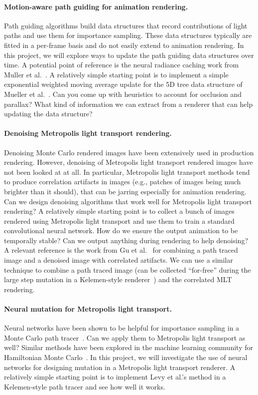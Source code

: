 \paragraph{Motion-aware path guiding for animation rendering.}
Path guiding algorithms build data structures that record contributions of light paths and use them for importance sampling.
These data structures typically are fitted in a per-frame basis and do not easily extend to animation rendering. 
In this project, we will explore ways to update the path guiding data structures over time.
A potential point of reference is the neural radiance caching work from Muller et al.~\cite{Muller:2021:RNR}.
A relatively simple starting point is to implement a simple exponential weighted moving average update for the 5D tree data structure of Mueller et al.~\cite{Mueller:2017:PPG}.
Can you come up with heuristics to account for occlusion and parallax? What kind of information we can extract from a renderer that can help updating the data structure?

\paragraph{Denoising Metropolis light transport rendering.}
Denoising Monte Carlo rendered images have been extensively used in production rendering.
However, denoising of Metropolis light transport rendered images have not been looked at at all.
In particular, Metropolis light transport methods tend to produce correlation artifacts in images (e.g., patches of images being much brighter than it should), that can be jarring especially for animation rendering.
Can we design denoising algorithms that work well for Metropolis light transport rendering?
A relatively simple starting point is to collect a bunch of images rendered using Metropolis light transport and use them to train a standard convolutional neural network.
How do we ensure the output animation to be temporally stable?
Can we output anything during rendering to help denoising? A relevant reference is the work from Gu et al.~\cite{Gu:2022:NJC} for combining a path traced image and a denoised image with correlated artifacts.
We can use a similar technique to combine a path traced image (can be collected ``for-free'' during the large step mutation in a Kelemen-style renderer~\cite{Kelemen:2002:SRM}) and the correlated MLT rendering.

\paragraph{Neural mutation for Metropolis light transport.}
Neural networks have been shown to be helpful for importance sampling in a Monte Carlo path tracer~\cite{Muller:2019:NIS}.
Can we apply them to Metropolis light transport as well?
Similar methods have been explored in the machine learning community for Hamiltonian Monte Carlo~\cite{Levy:2018:GHM}.
In this project, we will investigate the use of neural networks for designing mutation in a Metropolis light transport renderer.
A relatively simple starting point is to implement Levy et al.'s method in a Kelemen-style path tracer and see how well it works. 

